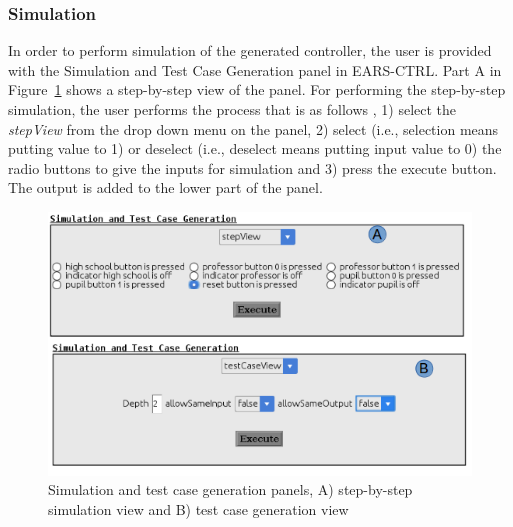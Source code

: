 \subsubsection{Simulation}
\vspace{-.2cm}
In order to perform simulation of the generated controller, the user is provided
with the \textsf{Simulation and Test Case Generation} panel in
\textsf{EARS-CTRL}. \textsf{Part A} in Figure~\ref{fig:PanelView} shows a
step-by-step view of the panel. For performing the step-by-step simulation, the
user performs the process that is as follows , 1) select the
\textsf{\emph{stepView}} from the drop down menu on the panel, 2) select (i.e.,
selection means putting value to 1) or deselect (i.e., deselect means putting input value to 0) the radio buttons to give the inputs for simulation and 3) press the execute button. The output is added to
the lower part of the  panel. 
\begin{figure}[!h]
\centering
\includegraphics[width=.9\textwidth]{./images/Two_Views_Panel.png}
\caption{Simulation and test case generation panels, A) step-by-step simulation
view and B) test case generation view}
\label{fig:PanelView}
\vspace{-.4cm}
\end{figure}
\vspace{-.4cm}
